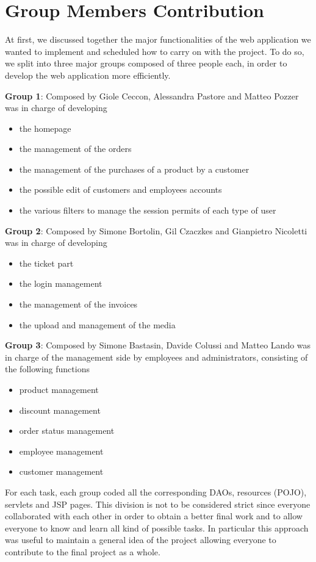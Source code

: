 \newpage
\section{Group Members Contribution}

At first, we discussed together the major functionalities of the web application we wanted to implement and scheduled how to carry on with the project.
To do so, we split into three major groups composed of three people each, in order to develop the web application more efficiently.


\begin{description}
	\item \textbf{Group 1}: Composed by Giole Ceccon, Alessandra Pastore and Matteo Pozzer was in charge of developing
	\begin{itemize}
		\item the homepage
		\item the management of the orders
		\item the management of the purchases of a product by a customer
		\item the possible edit of customers and employees accounts
		\item the various filters to manage the session permits of each type of user
	\end{itemize} 
	\item \textbf{Group 2}: Composed by Simone Bortolin, Gil Czaczkes and Gianpietro Nicoletti was in charge of developing
	\begin{itemize}
		\item the ticket part
		\item the login management
		\item the management of the invoices
		\item the upload and management of the media
	\end{itemize}
	\item \textbf{Group 3}: Composed by Simone Bastasin, Davide Colussi and Matteo Lando was in charge of the management side by employees and administrators, consisting of the following functions
	\begin{itemize}
		\item product management
		\item discount management
		\item order status management
		\item employee management
		\item customer management
	\end{itemize}
\end{description}

For each task, each group coded all the corresponding DAOs, resources (POJO), servlets and JSP pages.
This division is not to be considered strict since everyone collaborated with each other in order to obtain a better final work 
and to allow everyone to know and learn all kind of possible tasks. 
In particular this approach was useful to maintain a general idea of the project allowing everyone to contribute to the final project as a whole.

